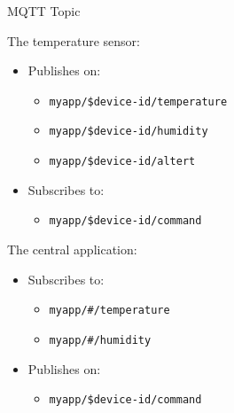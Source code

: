 \begin{frame}[fragile]{MQTT Topic}
\protect\hypertarget{mqtt-topic}{}

The temperature sensor:

\begin{itemize}
\tightlist
\item
  Publishes on:

  \begin{itemize}
  \tightlist
  \item
    \texttt{myapp/\$device-id/temperature}
  \item
    \texttt{myapp/\$device-id/humidity}
  \item
    \texttt{myapp/\$device-id/altert}
  \end{itemize}
\item
  Subscribes to:

  \begin{itemize}
  \tightlist
  \item
    \texttt{myapp/\$device-id/command}
  \end{itemize}
\end{itemize}

The central application:

\begin{itemize}
\tightlist
\item
  Subscribes to:

  \begin{itemize}
  \tightlist
  \item
    \texttt{myapp/\#/temperature}
  \item
    \texttt{myapp/\#/humidity}
  \end{itemize}
\item
  Publishes on:

  \begin{itemize}
  \tightlist
  \item
    \texttt{myapp/\$device-id/command}
  \end{itemize}
\end{itemize}


\end{frame}

